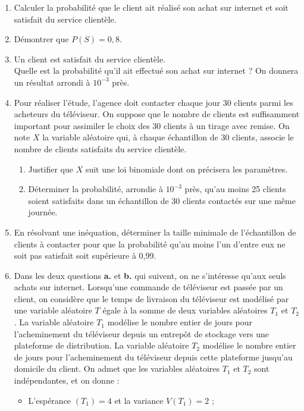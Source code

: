 \documentclass[11pt,fleqn, openany]{book} %
\begin{document}
\begin{exercise}[topic=lgn04, subtitle={(Métropole 2024, Jour 1)}]
\begin{enumerate}
\item Calculer la probabilité que le client ait réalisé son achat sur internet et soit satisfait
du service clientèle.
\vskip5pt
\item Démontrer que $P(S) = 0,8$.
\vskip5pt
\item Un client est satisfait du service clientèle.\\ Quelle est la probabilité qu'il ait effectué son achat sur internet ? On donnera un résultat arrondi à $10^{-3}$ près.
\vskip5pt
\item Pour réaliser l'étude, l'agence doit contacter chaque jour 30 clients parmi les acheteurs du téléviseur. On suppose que le nombre de clients est suffisamment important
pour assimiler le choix des 30 clients à un tirage avec remise. On note $X$ la variable aléatoire qui, à chaque échantillon de 30 clients, associe le nombre de clients satisfaits du service clientèle.
\begin{enumerate}
\item Justifier que $X$ suit une loi binomiale dont on précisera les paramètres.
\item Déterminer la probabilité, arrondie à $10^{-3}$ près, qu'au moins 25 clients soient satisfaits dans un échantillon de 30 clients contactés sur une même journée.\end{enumerate}
\vskip5pt
\item En résolvant une inéquation, déterminer la taille minimale de l'échantillon de clients à contacter pour que la probabilité qu'au moins l'un d'entre eux ne soit pas satisfait soit supérieure à 0,99.
\vskip5pt
\item Dans les deux questions \textbf{a.} et \textbf{b.} qui suivent, on ne s'intéresse qu'aux seuls achats sur
internet.
\vskip5pt
Lorsqu'une commande de téléviseur est passée par un client, on considère que le
temps de livraison du téléviseur est modélisé par une variable aléatoire $T$ égale à la
somme de deux variables aléatoires $T_1$ et $T_2$.
\vskip5pt
La variable aléatoire $T_1$ modélise le nombre entier de jours pour l'acheminement du téléviseur depuis un entrepôt de stockage vers une plateforme de distribution. La
variable aléatoire $T_2$ modélise le nombre entier de jours pour l'acheminement du téléviseur depuis cette plateforme jusqu'au domicile du client.
\vskip5pt
On admet que les variables aléatoires $T_1$ et $T_2$ sont indépendantes, et on donne :
\begin{itemize}
\item L'espérance $ (T_1) = 4$ et la variance $V (T_1) = 2$ ;

\end{itemize}
\end{enumerate}
\end{exercise}
\end{document}
